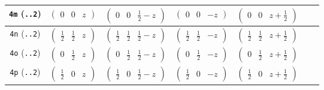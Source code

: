 \documentclass[fleqn,9pt,landscape]{jsarticle}
\begin{document}
\begin{center}
\begin{longtable}{ccccccc}
{\tt 4m} ({\tt ..2}) & $ \begin{pmatrix} 0 & 0 & z \end{pmatrix} $ & $ \begin{pmatrix} 0 & 0 & \frac{1}{2} - z \end{pmatrix} $ & $ \begin{pmatrix} 0 & 0 & - z \end{pmatrix} $ & $ \begin{pmatrix} 0 & 0 & z + \frac{1}{2} \end{pmatrix} $ & $  $ & $  $ \\ \hline
{\tt 4n} ({\tt ..2}) & $ \begin{pmatrix} \frac{1}{2} & \frac{1}{2} & z \end{pmatrix} $ & $ \begin{pmatrix} \frac{1}{2} & \frac{1}{2} & \frac{1}{2} - z \end{pmatrix} $ & $ \begin{pmatrix} \frac{1}{2} & \frac{1}{2} & - z \end{pmatrix} $ & $ \begin{pmatrix} \frac{1}{2} & \frac{1}{2} & z + \frac{1}{2} \end{pmatrix} $ & $  $ & $  $ \\ \hline
{\tt 4o} ({\tt ..2}) & $ \begin{pmatrix} 0 & \frac{1}{2} & z \end{pmatrix} $ & $ \begin{pmatrix} 0 & \frac{1}{2} & \frac{1}{2} - z \end{pmatrix} $ & $ \begin{pmatrix} 0 & \frac{1}{2} & - z \end{pmatrix} $ & $ \begin{pmatrix} 0 & \frac{1}{2} & z + \frac{1}{2} \end{pmatrix} $ & $  $ & $  $ \\ \hline
{\tt 4p} ({\tt ..2}) & $ \begin{pmatrix} \frac{1}{2} & 0 & z \end{pmatrix} $ & $ \begin{pmatrix} \frac{1}{2} & 0 & \frac{1}{2} - z \end{pmatrix} $ & $ \begin{pmatrix} \frac{1}{2} & 0 & - z \end{pmatrix} $ & $ \begin{pmatrix} \frac{1}{2} & 0 & z + \frac{1}{2} \end{pmatrix} $ & $  $ & $  $ \\ \hline

\end{longtable}
\end{center}
\end{document}
